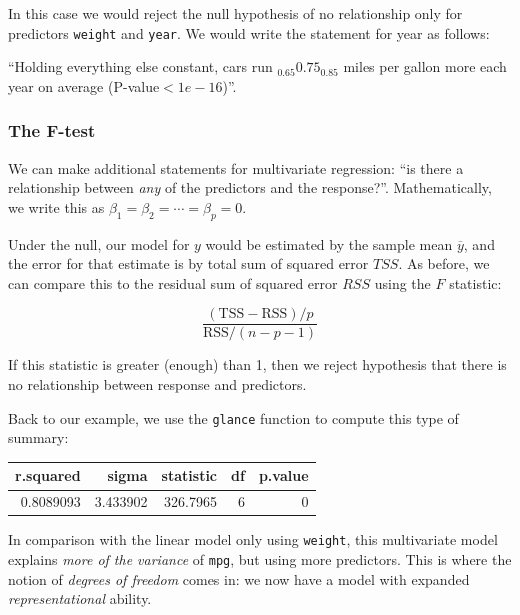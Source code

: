 \documentclass[]{article}
\newenvironment{Shaded}{\begin{snugshade}}{\end{snugshade}}
\newcommand{\KeywordTok}[1]{\textcolor[rgb]{0.13,0.29,0.53}{\textbf{{#1}}}}
\newcommand{\StringTok}[1]{\textcolor[rgb]{0.31,0.60,0.02}{{#1}}}
\newcommand{\NormalTok}[1]{{#1}}
\theoremstyle{definition}
\theoremstyle{definition}
\theoremstyle{remark}
\begin{document}
In this case we would reject the null hypothesis of no relationship only
for predictors \texttt{weight} and \texttt{year}. We would write the
statement for year as follows:

``Holding everything else constant, cars run \({}_{0.65} 0.75_{0.85}\)
miles per gallon more each year on average (P-value\(<1e-16\))''.

\subsubsection{The F-test}\label{the-f-test}

We can make additional statements for multivariate regression: ``is
there a relationship between \emph{any} of the predictors and the
response?''. Mathematically, we write this as
\(\beta_1 = \beta_2 = \cdots = \beta_p = 0\).

Under the null, our model for \(y\) would be estimated by the sample
mean \(\overline{y}\), and the error for that estimate is by total sum
of squared error \(TSS\). As before, we can compare this to the residual
sum of squared error \(RSS\) using the \(F\) statistic:

\[
\frac{(\mathrm{TSS}-\mathrm{RSS})/p}{\mathrm{RSS}/(n-p-1)}
\]

If this statistic is greater (enough) than 1, then we reject hypothesis
that there is no relationship between response and predictors.

Back to our example, we use the \texttt{glance} function to compute this
type of summary:

\begin{Shaded}
\end{Shaded}

\begin{tabular}{r|r|r|r|r}
\hline
r.squared & sigma & statistic & df & p.value\\
\hline
0.8089093 & 3.433902 & 326.7965 & 6 & 0\\
\hline
\end{tabular}

In comparison with the linear model only using \texttt{weight}, this
multivariate model explains \emph{more of the variance} of \texttt{mpg},
but using more predictors. This is where the notion of \emph{degrees of
freedom} comes in: we now have a model with expanded
\emph{representational} ability.
\end{document}
